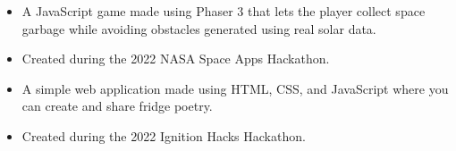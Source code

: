 \begin{itemize}
  \item A JavaScript game made using Phaser 3 that lets the player collect space garbage while avoiding obstacles generated using real solar data.
  \item Created during the 2022 NASA Space Apps Hackathon.
\end{itemize}
\divider\small

\begin{itemize}
  \item A simple web application made using HTML, CSS, and JavaScript where you can create and share fridge poetry.
  \item Created during the 2022 Ignition Hacks Hackathon.
\end{itemize}






